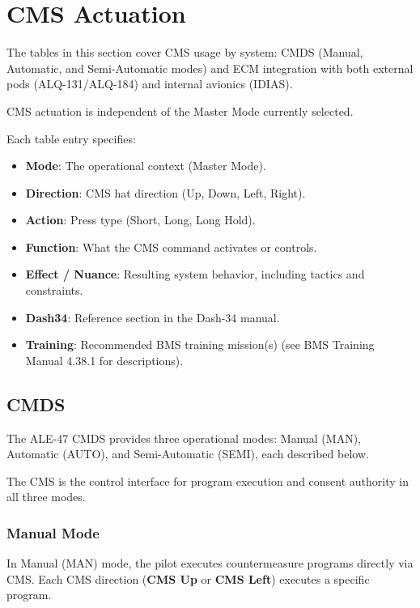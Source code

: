 \documentclass[11pt, a4paper, twoside]{report}
\newcommand{\trnman}{BMS Training Manual 4.38.1}
\begin{document}
\section{CMS Actuation}
\label{sec:C5-S2}

The tables in this section cover CMS usage by system: CMDS (Manual, Automatic, and Semi-Automatic modes) and ECM integration with both external pods (ALQ-131/ALQ-184) and internal avionics (IDIAS). 

CMS actuation is independent of the Master Mode currently selected.

Each table entry specifies:

\begin{itemize}
  \item \textbf{Mode}: The operational context (Master Mode).
  \item \textbf{Direction}: CMS hat direction (Up, Down, Left, Right).
  \item \textbf{Action}: Press type (Short, Long, Long Hold).
  \item \textbf{Function}: What the CMS command activates or controls.
  \item \textbf{Effect / Nuance}: Resulting system behavior, including tactics and constraints.
  \item \textbf{Dash34}: Reference section in the Dash-34 manual.
  \item \textbf{Training}: Recommended BMS training mission(s) (see \trnman{} for descriptions).
\end{itemize}

\subsection{CMDS}
\label{sec:C5-S2-S1}

The ALE-47 CMDS provides three operational modes: Manual (MAN), Automatic (AUTO), and Semi-Automatic (SEMI), each described below.

The CMS is the control interface for program execution and consent authority in all three modes.

\subsubsection{Manual Mode}
\label{sec:C5-S2-S1-S1}

In Manual (MAN) mode, the pilot executes countermeasure programs directly via CMS. Each CMS direction (\textbf{CMS Up} or \textbf{CMS Left}) executes a specific program.
\end{document}
